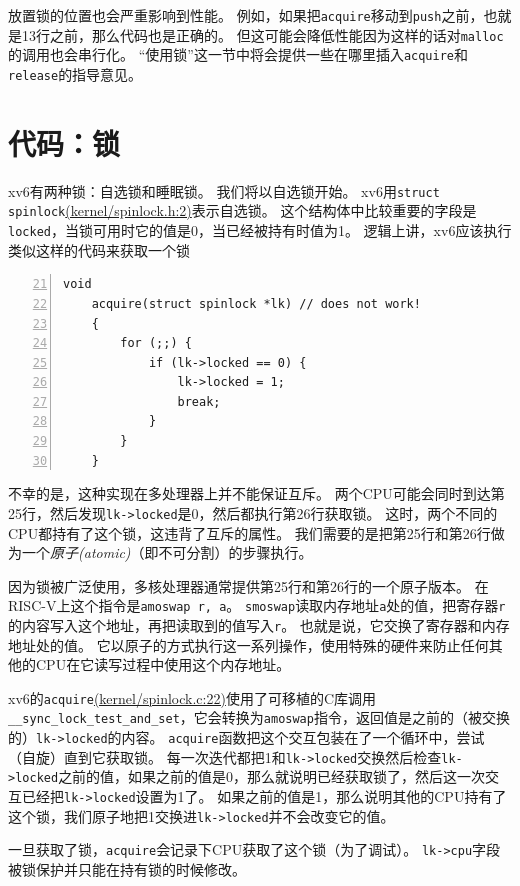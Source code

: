 放置锁的位置也会严重影响到性能。
例如，如果把\texttt{acquire}移动到\texttt{push}之前，也就是13行之前，那么代码也是正确的。
但这可能会降低性能因为这样的话对\texttt{malloc}的调用也会串行化。
“使用锁”这一节中将会提供一些在哪里插入\texttt{acquire}和\texttt{release}的指导意见。

\section{代码：锁}
xv6有两种锁：自选锁和睡眠锁。
我们将以自选锁开始。
xv6用\texttt{struct spinlock}\href{https://github.com/mit-pdos/xv6-riscv/blob/riscv//kernel/spinlock.h#L2}{(kernel/spinlock.h:2)}表示自选锁。
这个结构体中比较重要的字段是\texttt{locked}，当锁可用时它的值是0，当已经被持有时值为1。
逻辑上讲，xv6应该执行类似这样的代码来获取一个锁
\begin{lstlisting}[numbers=left,firstnumber=21]
    void
    acquire(struct spinlock *lk) // does not work!
    {
        for (;;) {
            if (lk->locked == 0) {
                lk->locked = 1;
                break;
            }
        }
    }
\end{lstlisting}
不幸的是，这种实现在多处理器上并不能保证互斥。
两个CPU可能会同时到达第25行，然后发现\texttt{lk->locked}是0，然后都执行第26行获取锁。
这时，两个不同的CPU都持有了这个锁，这违背了互斥的属性。
我们需要的是把第25行和第26行做为一个\emph{原子(atomic)}（即不可分割）的步骤执行。

因为锁被广泛使用，多核处理器通常提供第25行和第26行的一个原子版本。
在RISC-V上这个指令是\texttt{amoswap r, a}。
\texttt{smoswap}读取内存地址\texttt{a}处的值，把寄存器\texttt{r}的内容写入这个地址，再把读取到的值写入\texttt{r}。
也就是说，它交换了寄存器和内存地址处的值。
它以原子的方式执行这一系列操作，使用特殊的硬件来防止任何其他的CPU在它读写过程中使用这个内存地址。

xv6的\texttt{acquire}\href{https://github.com/mit-pdos/xv6-riscv/blob/riscv//kernel/spinlock.c#L22}{(kernel/spinlock.c:22)}使用了可移植的C库调用\texttt{\_\_sync\_lock\_test\_and\_set}，它会转换为\texttt{amoswap}指令，返回值是之前的（被交换的）\texttt{lk->locked}的内容。
\texttt{acquire}函数把这个交互包装在了一个循环中，尝试（自旋）直到它获取锁。
每一次迭代都把1和\texttt{lk->locked}交换然后检查\texttt{lk->locked}之前的值，如果之前的值是0，那么就说明已经获取锁了，然后这一次交互已经把\texttt{lk->locked}设置为1了。
如果之前的值是1，那么说明其他的CPU持有了这个锁，我们原子地把1交换进\texttt{lk->locked}并不会改变它的值。

一旦获取了锁，\texttt{acquire}会记录下CPU获取了这个锁（为了调试）。
\texttt{lk->cpu}字段被锁保护并只能在持有锁的时候修改。

